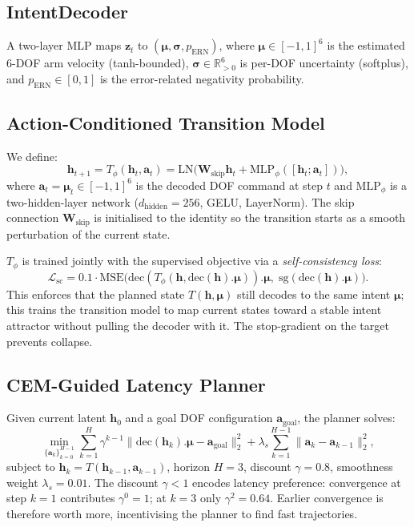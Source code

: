 \documentclass[journal]{IEEEtran}
\begin{document}
\subsection{IntentDecoder}
\label{sec:decoder}

A two-layer MLP maps $\mathbf{z}_t$ to $(\bm\mu, \bm\sigma, p_\text{ERN})$, where $\bm\mu \in [-1,1]^6$ is the estimated 6-DOF arm velocity (tanh-bounded), $\bm\sigma \in \mathbb{R}_{>0}^6$ is per-DOF uncertainty (softplus), and $p_\text{ERN} \in [0,1]$ is the error-related negativity probability.

\subsection{Action-Conditioned Transition Model}
\label{sec:transition}

We define:
\begin{equation}
  \mathbf{h}_{t+1} = T_\phi(\mathbf{h}_t, \mathbf{a}_t) = \text{LN}\bigl(\mathbf{W}_\text{skip}\mathbf{h}_t + \text{MLP}_\phi([\mathbf{h}_t; \mathbf{a}_t])\bigr),
  \label{eq:transition}
\end{equation}
where $\mathbf{a}_t = \bm\mu_t \in [-1,1]^6$ is the decoded DOF command at step $t$ and $\text{MLP}_\phi$ is a two-hidden-layer network ($d_\text{hidden}=256$, GELU, LayerNorm).
The skip connection $\mathbf{W}_\text{skip}$ is initialised to the identity so the transition starts as a smooth perturbation of the current state.

$T_\phi$ is trained jointly with the supervised objective via a \emph{self-consistency loss}:
\begin{equation}
  \mathcal{L}_\text{sc} = 0.1 \cdot \text{MSE}\bigl(\text{dec}(T_\phi(\mathbf{h}, \text{dec}(\mathbf{h}).\bm\mu)).\bm\mu,\; \text{sg}(\text{dec}(\mathbf{h}).\bm\mu)\bigr).
  \label{eq:selfconsistency}
\end{equation}
This enforces that the planned state $T(\mathbf{h}, \bm\mu)$ still decodes to the same intent $\bm\mu$; this trains the transition model to map current states toward a stable intent attractor without pulling the decoder with it.
The stop-gradient on the target prevents collapse.

\subsection{CEM-Guided Latency Planner}
\label{sec:planner}

Given current latent $\mathbf{h}_0$ and a goal DOF configuration $\mathbf{a}_\text{goal}$, the planner solves:
\begin{equation}
  \min_{\{\mathbf{a}_k\}_{k=0}^{H-1}} \sum_{k=1}^{H} \gamma^{k-1} \|\text{dec}(\mathbf{h}_k).\bm\mu - \mathbf{a}_\text{goal}\|_2^2 + \lambda_s \sum_{k=1}^{H-1} \|\mathbf{a}_k - \mathbf{a}_{k-1}\|_2^2,
  \label{eq:mpc}
\end{equation}
subject to $\mathbf{h}_k = T(\mathbf{h}_{k-1}, \mathbf{a}_{k-1})$, horizon $H=3$, discount $\gamma=0.8$, smoothness weight $\lambda_s=0.01$.
The discount $\gamma < 1$ encodes latency preference: convergence at step $k=1$ contributes $\gamma^0 = 1$; at $k=3$ only $\gamma^2 = 0.64$.
Earlier convergence is therefore worth more, incentivising the planner to find fast trajectories.
\end{document}
